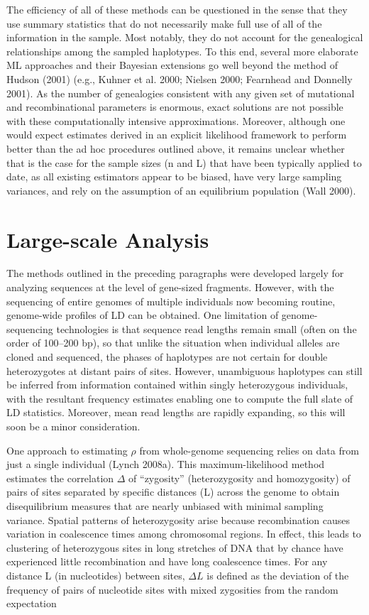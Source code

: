 \documentclass{article}
\begin{document}
The efficiency of all of these methods can be questioned in the sense that they use summary statistics that do not necessarily make full use of all of the information in the sample. Most notably, they do not account for the genealogical relationships among the sampled haplotypes. To this end, several more elaborate ML approaches and their Bayesian extensions go well beyond the method of Hudson (2001) (e.g., Kuhner et al. 2000; Nielsen 2000; Fearnhead and Donnelly 2001). As the number of genealogies consistent with any given set of mutational and recombinational parameters is enormous, exact solutions are not possible with these computationally intensive approximations. Moreover, although one would expect estimates derived in an explicit likelihood framework to perform better than the ad hoc procedures outlined above, it remains unclear whether that is the case for the sample sizes (n and L) that have been typically applied to date, as all existing estimators appear to be biased, have very large sampling variances, and rely on the assumption of an equilibrium population (Wall 2000).

\section{Large-scale Analysis}
The methods outlined in the preceding paragraphs were developed largely for analyzing sequences at the level of gene-sized fragments. However, with the sequencing of entire genomes of multiple individuals now becoming routine, genome-wide profiles of LD can be obtained. One limitation of genome-sequencing technologies is that sequence read lengths remain small (often on the order of 100–200 bp), so that unlike the situation when individual alleles are cloned and sequenced, the phases of haplotypes are not certain for double heterozygotes at distant pairs of sites. However, unambiguous haplotypes can still be inferred from information contained within singly heterozygous individuals, with the resultant frequency estimates enabling one to compute the full slate of LD statistics. Moreover, mean read lengths are rapidly expanding, so this will soon be a minor consideration.

One approach to estimating  $ \rho $ from whole-genome sequencing relies on data from just a single individual (Lynch 2008a). This maximum-likelihood method estimates the correlation  $ \Delta $ of “zygosity” (heterozygosity and homozygosity) of pairs of sites separated by specific distances (L) across the genome to obtain disequilibrium measures that are nearly unbiased with minimal sampling variance. Spatial patterns of heterozygosity arise because recombination causes variation in coalescence times among chromosomal regions. In effect, this leads to clustering of heterozygous sites in long stretches of DNA that by chance have experienced little recombination and have long coalescence times. For any distance L (in nucleotides) between sites,  $ \Delta L $ is defined as the deviation of the frequency of pairs of nucleotide sites with mixed zygosities from the random expectation
\end{document}
